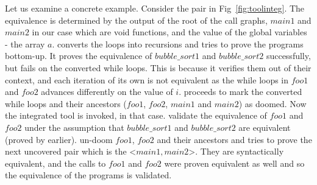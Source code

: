 Let us examine a concrete example. Consider the pair in Fig~\ref{fig:toolinteg}. The equivalence is determined by the output of the root of the call graphs, $main1$ and $main2$ in our case which are void functions, and the value of the global variables - the array $a$.
 converts the loops into recursions and tries to prove the programs bottom-up. It proves the equivalence of $bubble\_sort1$ and $bubble\_sort2$ successfully, but fails on the converted while loops. This is because it verifies them out of their context, and each iteration of its own is not equivalent as the while loops in $foo1$ and $foo2$ advances differently on the value of $i$.  proceeds to mark the converted while loops and their ancestors ($foo1$, $foo2$, $main1$ and $main2$) as doomed. Now the integrated tool is invoked,  in that case.  validate the equivalence of $foo1$ and $foo2$ under the assumption that $bubble\_sort1$ and $bubble\_sort2$ are equivalent (proved by  earlier).  un-doom $foo1$, $foo2$ and their ancestors and tries to prove the next uncovered pair which is the <$main1,main2$>. They are syntactically equivalent, and the calls to $foo1$ and $foo2$ were proven equivalent as well and so the equivalence of the programs is validated.



